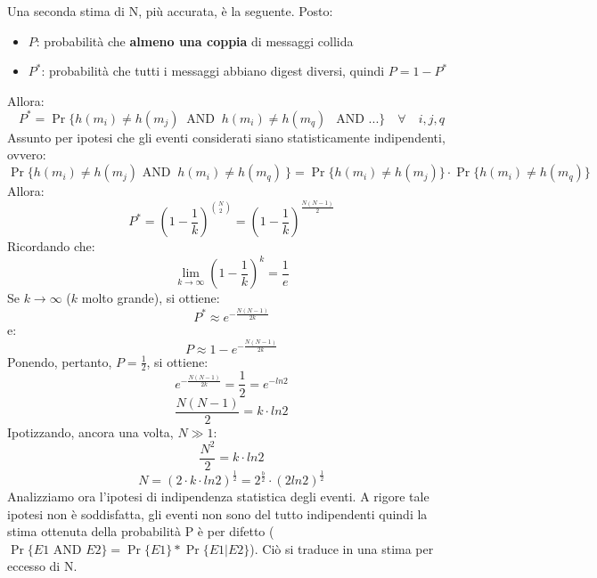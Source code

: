 Una seconda stima di N, più accurata, è la seguente. Posto:
\begin{itemize}
\item $P$: probabilità che \textbf{almeno una coppia} di messaggi collida
\item $P^{*}$: probabilità che tutti i messaggi abbiano digest diversi, quindi $P = 1 - P^{*}$
\end{itemize}
Allora:
\begin{equation}
P^{*} = \Pr\{h(m_i) \neq h(m_j) \: \mbox{ AND } \: h(m_i) \neq h(m_q)\ \: \mbox{ AND } ... \}  \quad \forall \quad i,j,q
\end{equation}
Assunto per ipotesi che gli eventi considerati siano statisticamente indipendenti, ovvero:
\begin{equation}
\Pr\{h(m_i) \neq h(m_j) \mbox{ AND } \: h(m_i) \neq h(m_q)\ \} = \Pr\{h(m_i) \neq h(m_j)\} \cdot \Pr\{h(m_i) \neq h(m_q)\}
\end{equation}
Allora:
\begin{equation}
P^{*} = (1 - \frac{1}{k})^{\binom {N}{2}} = (1 - \frac{1}{k})^{\frac{N(N-1)}{2}}
\end{equation}
Ricordando che:
\begin{equation}
 \lim_{k\to \infty}{(1 - \frac{1}{k})^k} = \frac{1}{e} 
\end{equation}
Se $k\to \infty$ ($k$ molto grande), si ottiene:
\begin{equation}
P^{*} \approx e^{-\frac{N(N-1)}{2k}}
\end{equation}
e:
\begin{equation}
P \approx 1 - e^{-\frac{N(N-1)}{2k}}
\end{equation}
Ponendo, pertanto, $P = \frac{1}{2}$, si ottiene:
\begin{equation}
e^{-\frac{N(N-1)}{2k}} = \frac{1}{2} = e^{-ln2}
\end{equation}
\begin{equation}
\frac{N(N-1)}{2} = k \cdot ln2
\end{equation}
Ipotizzando, ancora una volta, $N \gg 1$:
\begin{equation}
\frac{N^2}{2} = k \cdot ln2 
\end{equation}
\begin{equation}
N = (2 \cdot k \cdot ln2)^{\frac{1}{2}} = 2^{\frac{b}{2}} \cdot (2ln2)^{\frac{1}{2}}
\end{equation}
Analizziamo ora l'ipotesi di indipendenza statistica degli eventi. A rigore tale ipotesi non è soddisfatta, gli eventi non sono del tutto indipendenti quindi la stima ottenuta della probabilità P è per difetto ($\Pr\{E1 \mbox{ AND } E2\} = \Pr\{E1\} * \Pr\{E1|E2\}$). Ciò si traduce in una stima per eccesso di N. 

